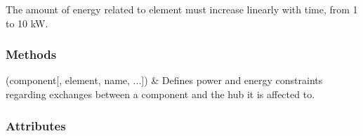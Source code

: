 \documentclass[letterpaper,10pt,english]{sphinxmanual}
\begin{document}
\begin{fulllineitems}
\begin{fulllineitems}
\sphinxAtStartPar
The amount of energy related to element  must increase linearly with time, from 1 to 10 kW.

\end{fulllineitems}

\subsubsection*{Methods}


\begin{savenotes}\sphinxattablestart
\centering
\begin{tabulary}{\linewidth}[t]{}
\hline

\sphinxAtStartPar
{\hyperref[\detokenize{generated/tamos.InterfaceMask:tamos.InterfaceMask.__init__}]{}}(component{[}, element, name, ...{]})
&
\sphinxAtStartPar
Defines power and energy constraints regarding exchanges between a component and the hub it is affected to.
\\
\hline
\end{tabulary}
\par
\sphinxattableend\end{savenotes}
\subsubsection*{Attributes}


\begin{savenotes}\sphinxattablestart
\centering
\begin{tabulary}{\linewidth}[t]{}
\hline


\end{tabulary}
\end{savenotes}
\end{fulllineitems}
\end{document}
